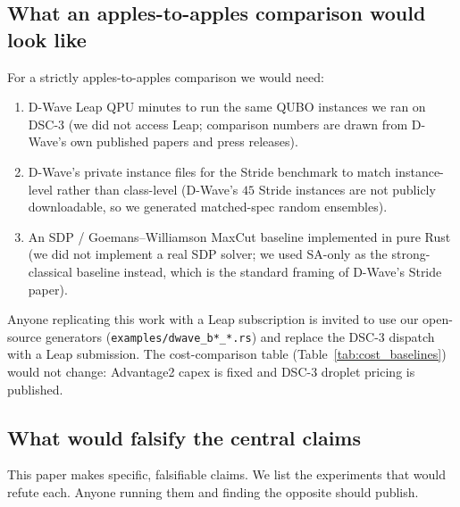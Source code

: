 \documentclass[11pt,a4paper]{article}
\begin{document}
\subsection{What an apples-to-apples comparison would look like}

For a strictly apples-to-apples comparison we would need:
\begin{enumerate}\itemsep0.15em
\item D-Wave Leap QPU minutes to run the same QUBO instances we
  ran on DSC-3 (we did not access Leap; comparison numbers are
  drawn from D-Wave's own published papers and press releases).
\item D-Wave's private instance files for the Stride benchmark to
  match instance-level rather than class-level (D-Wave's $45$ Stride
  instances are not publicly downloadable, so we generated matched-spec
  random ensembles).
\item An SDP / Goemans--Williamson MaxCut baseline implemented in
  pure Rust (we did not implement a real SDP solver; we used SA-only
  as the strong-classical baseline instead, which is the standard
  framing of D-Wave's Stride paper).
\end{enumerate}

Anyone replicating this work with a Leap subscription is invited to
use our open-source generators (\texttt{examples/dwave\_b*\_*.rs}) and
replace the DSC-3 dispatch with a Leap submission. The cost-comparison
table (Table~\ref{tab:cost_baselines}) would not change: Advantage2 capex
is fixed and DSC-3 droplet pricing is published.

\subsection{What would falsify the central claims}
\label{sec:falsification}

This paper makes specific, falsifiable claims. We list the experiments
that would refute each. Anyone running them and finding the opposite
should publish.
\end{document}
